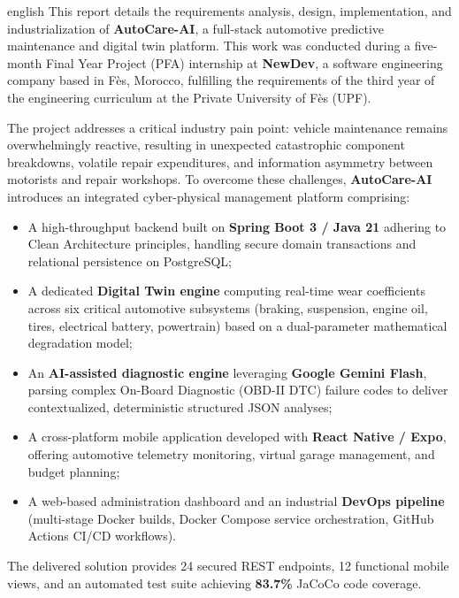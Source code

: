 \documentclass[12pt,a4paper,oneside]{report}
\newcommand{\bpuce}{\textcolor{midBlue}{$\blacktriangleright$}\;}
\begin{document}
\begin{otherlanguage*}{english}
This report details the requirements analysis, design, implementation, and industrialization of \textbf{AutoCare-AI}, a full-stack automotive predictive maintenance and digital twin platform. This work was conducted during a five-month Final Year Project (PFA) internship at \textbf{NewDev}, a software engineering company based in Fès, Morocco, fulfilling the requirements of the third year of the engineering curriculum at the Private University of Fès (UPF).

The project addresses a critical industry pain point: vehicle maintenance remains overwhelmingly reactive, resulting in unexpected catastrophic component breakdowns, volatile repair expenditures, and information asymmetry between motorists and repair workshops. To overcome these challenges, \textbf{AutoCare-AI} introduces an integrated cyber-physical management platform comprising:
\begin{itemize}[label=\bpuce]
  \item A high-throughput backend built on \textbf{Spring Boot 3 / Java 21} adhering to Clean Architecture principles, handling secure domain transactions and relational persistence on PostgreSQL;
  \item A dedicated \textbf{Digital Twin engine} computing real-time wear coefficients across six critical automotive subsystems (braking, suspension, engine oil, tires, electrical battery, powertrain) based on a dual-parameter mathematical degradation model;
  \item An \textbf{AI-assisted diagnostic engine} leveraging \textbf{Google Gemini Flash}, parsing complex On-Board Diagnostic (OBD-II DTC) failure codes to deliver contextualized, deterministic structured JSON analyses;
  \item A cross-platform mobile application developed with \textbf{React Native / Expo}, offering automotive telemetry monitoring, virtual garage management, and budget planning;
  \item A web-based administration dashboard and an industrial \textbf{DevOps pipeline} (multi-stage Docker builds, Docker Compose service orchestration, GitHub Actions CI/CD workflows).
\end{itemize}

The delivered solution provides 24 secured REST endpoints, 12 functional mobile views, and an automated test suite achieving \textbf{83.7\%} JaCoCo code coverage.
\end{otherlanguage*}
\end{document}
